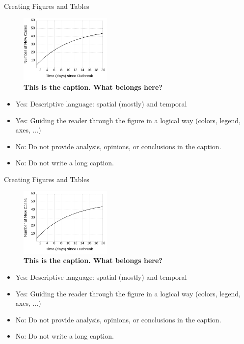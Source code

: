 \documentclass{beamer}
\begin{document}
\begin{frame}{Creating Figures and Tables}
\small
\begin{figure}
\includegraphics[width=0.4\textwidth]{figures/outbreak.png}
\caption{\label{fig:outbreak2} \textbf{This is the caption.  What belongs here?}}
\end{figure}
\begin{itemize}
\item Yes: Descriptive language: spatial (mostly) and temporal
\item Yes: Guiding the reader through the figure in a logical way (colors, legend, axes, ...)
\item No: Do not provide analysis, opinions, or conclusions in the caption.
\item No: Do not write a long caption.
\end{itemize}
\end{frame}

\begin{frame}{Creating Figures and Tables}
\small
\begin{figure}
\includegraphics[width=0.4\textwidth]{figures/outbreak.png}
\caption{\label{fig:outbreak3} \textbf{This is the caption.  What belongs here?}}
\end{figure}
\begin{itemize}
\item Yes: Descriptive language: spatial (mostly) and temporal
\item Yes: Guiding the reader through the figure in a logical way (colors, legend, axes, ...)
\item No: Do not provide analysis, opinions, or conclusions in the caption.
\item No: Do not write a long caption.
\end{itemize}
\end{frame}
\end{document}
